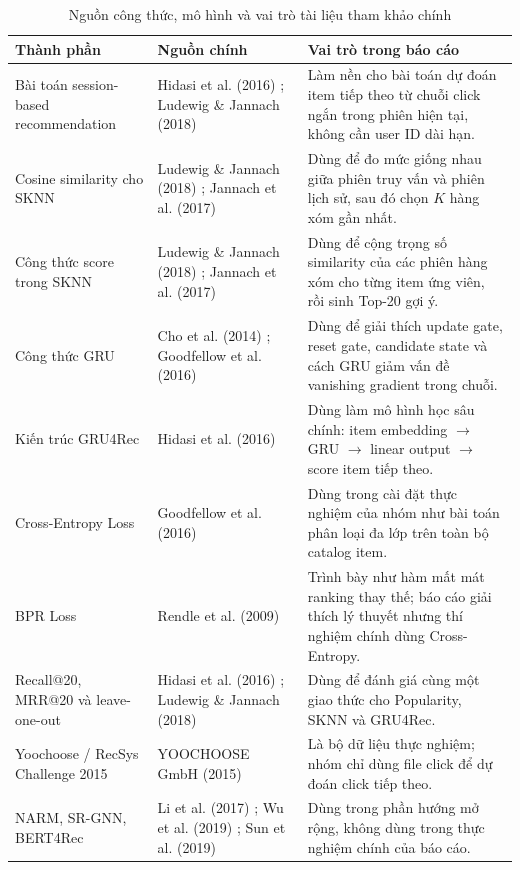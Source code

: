 \documentclass[12pt, a4paper]{article}
\begin{document}
\begin{table}[H]
\centering
\small
\caption{Nguồn công thức, mô hình và vai trò tài liệu tham khảo chính}
\label{tab:formula_source_map}
\begin{tabularx}{\textwidth}{L{3.2cm} L{4.1cm} X}
\toprule
\textbf{Thành phần} & \textbf{Nguồn chính} & \textbf{Vai trò trong báo cáo} \\
\midrule
Bài toán session-based recommendation & Hidasi et al. (2016) \cite{hidasi2016}; Ludewig \& Jannach (2018) \cite{ludewig2018} & Làm nền cho bài toán dự đoán item tiếp theo từ chuỗi click ngắn trong phiên hiện tại, không cần user ID dài hạn. \\
Cosine similarity cho SKNN & Ludewig \& Jannach (2018) \cite{ludewig2018}; Jannach et al. (2017) \cite{jannach2017} & Dùng để đo mức giống nhau giữa phiên truy vấn và phiên lịch sử, sau đó chọn $K$ hàng xóm gần nhất. \\
Công thức score trong SKNN & Ludewig \& Jannach (2018) \cite{ludewig2018}; Jannach et al. (2017) \cite{jannach2017} & Dùng để cộng trọng số similarity của các phiên hàng xóm cho từng item ứng viên, rồi sinh Top-20 gợi ý. \\
Công thức GRU & Cho et al. (2014) \cite{cho2014}; Goodfellow et al. (2016) \cite{goodfellow2016} & Dùng để giải thích update gate, reset gate, candidate state và cách GRU giảm vấn đề vanishing gradient trong chuỗi. \\
Kiến trúc GRU4Rec & Hidasi et al. (2016) \cite{hidasi2016} & Dùng làm mô hình học sâu chính: item embedding $\rightarrow$ GRU $\rightarrow$ linear output $\rightarrow$ score item tiếp theo. \\
Cross-Entropy Loss & Goodfellow et al. (2016) \cite{goodfellow2016} & Dùng trong cài đặt thực nghiệm của nhóm như bài toán phân loại đa lớp trên toàn bộ catalog item. \\
BPR Loss & Rendle et al. (2009) \cite{rendle2009} & Trình bày như hàm mất mát ranking thay thế; báo cáo giải thích lý thuyết nhưng thí nghiệm chính dùng Cross-Entropy. \\
Recall@20, MRR@20 và leave-one-out & Hidasi et al. (2016) \cite{hidasi2016}; Ludewig \& Jannach (2018) \cite{ludewig2018} & Dùng để đánh giá cùng một giao thức cho Popularity, SKNN và GRU4Rec. \\
Yoochoose / RecSys Challenge 2015 & YOOCHOOSE GmbH (2015) \cite{yoochoose2015} & Là bộ dữ liệu thực nghiệm; nhóm chỉ dùng file click để dự đoán click tiếp theo. \\
NARM, SR-GNN, BERT4Rec & Li et al. (2017) \cite{li2017}; Wu et al. (2019) \cite{wu2019}; Sun et al. (2019) \cite{sun2019} & Dùng trong phần hướng mở rộng, không dùng trong thực nghiệm chính của báo cáo. \\
\bottomrule
\end{tabularx}
\end{table}
\end{document}
